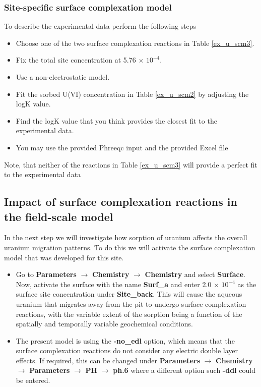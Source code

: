\subsubsection{Site-specific surface complexation model}

To describe the experimental data perform the following steps
\begin{itemize}
\item Choose one of the two surface complexation reactions 
in Table \ref{ex_u_scm3}. 
\item Fix the total site concentration at 5.76 $\times$ $10^{-4}$.  
\item Use a non-electrostatic model. 
\item Fit the sorbed U(VI) concentration in Table \ref{ex_u_scm2} 
by adjusting the logK value.   
\item Find the logK value that you think provides the closest 
fit to the experimental data. 
\item You may use the provided Phreeqc input and the provided Excel file
\end{itemize}

Note, that neither of the reactions in Table \ref{ex_u_scm3} 
will provide a perfect fit to the experimental data

\subsection{Impact of surface complexation reactions 
in the field-scale model}

In the next step we will investigate how sorption of uranium affects
the overall uranium migration patterns. To do this we will activate the
surface complexation model that was developed for this site. 

\begin{itemize}
\item Go to 
{\color{blue}\textbf{Parameters}}
$\rightarrow$ {\color{blue}\textbf{Chemistry}} 
$\rightarrow$ {\color{blue}\textbf{Chemistry}}
and select {\color{blue}\textbf{Surface}}.
Now, activate the surface with the name {\color{blue}\textbf{Surf\_a}} 
and enter 2.0 $\times$ $10^{-4}$ as the surface site
concentration under {\color{blue}\textbf{Site\_back}}.
This will cause the aqueous uranium that migrates away
from the pit to undergo surface complexation reactions,
with the variable extent of the sorption being a function 
of the spatially and temporally variable geochemical conditions.
\item The present model is using the {\color{blue}\textbf{-no\_edl}} 
option, which means that the surface complexation reactions
do not consider any electric double layer effects.
If required, this can be changed under 
{\color{blue}\textbf{Parameters}}
$\rightarrow$ {\color{blue}\textbf{Chemistry}} 
$\rightarrow$ {\color{blue}\textbf{Parameters}}
$\rightarrow$ {\color{blue}\textbf{PH}}
$\rightarrow$ {\color{blue}\textbf{ph.6}}
where a different option such  {\color{blue}\textbf{-ddl}} 
could be entered. 
\end{itemize}

